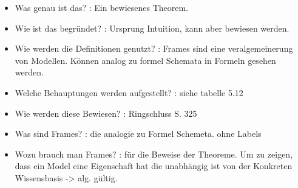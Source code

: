 \begin{itemize}
	\item Was genau ist das? : Ein bewiesenes Theorem.
	\item Wie ist das begründet? : Ursprung Intuition, kann aber bewiesen werden.
	\item Wie werden die Definitionen genutzt? : Frames sind eine veralgemeinerung von Modellen. Können analog zu formel Schemata in Formeln gesehen werden.
	\item Welche Behauptungen werden aufgestellt? : siehe tabelle 5.12
	\item Wie werden diese Bewiesen? : Ringschluss S. 325
	\item Was sind Frames? : die analogie zu Formel Schemeta. \KS ohne Labels
	\item Wozu brauch man Frames? : für die Beweise der Theoreme. Um zu zeigen, dass ein Model eine Eigenschaft hat die unabhängig ist von der Konkreten Wissensbasis -> alg. gültig.
\end{itemize}












